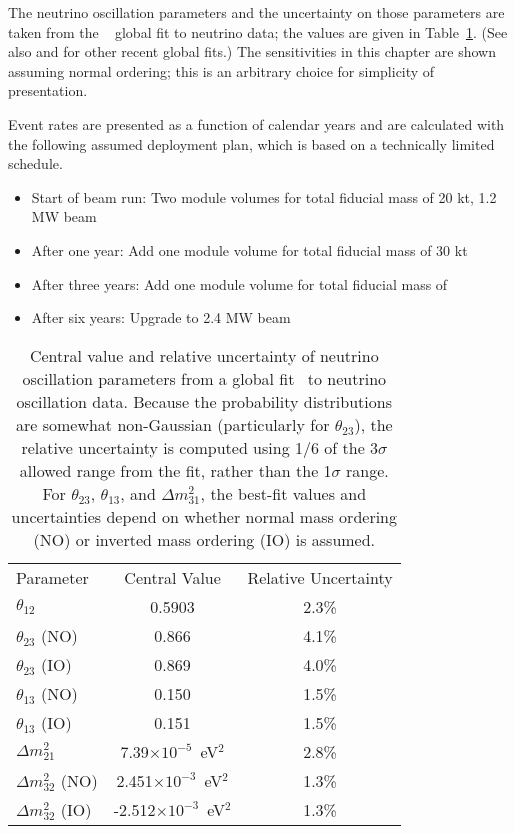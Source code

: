 The neutrino oscillation parameters and the uncertainty on those parameters are taken from the ~\cite{Esteban:2018azc,nufitweb} global fit to neutrino data; the
values are given in Table~\ref{tab:oscpar_nufit}.  (See also
\cite{deSalas:2017kay} and \cite{Capozzi:2017yic} for other recent global fits.) The sensitivities in this chapter are shown assuming normal ordering; this is an arbitrary choice for simplicity of presentation.

Event rates are presented as a function of calendar years and are calculated with the following assumed deployment plan, which is based on a technically limited schedule.
\begin{itemize}
    \item Start of beam run: Two  module %
    volumes for total fiducial mass of 20 kt, 1.2 MW beam
    \item After one year: Add one  module  volume for total fiducial mass of 30 kt
    \item After three years: Add one  module  volume for total fiducial mass of \fdfiducialmass
    \item After six years: Upgrade to 2.4 MW beam
\end{itemize}

\begin{table}[]
    \centering
    \begin{tabular}{lcc}
 Parameter &    Central Value & Relative Uncertainty \\
\toprowrule
$\theta_{12}$ & 0.5903 & 2.3\% \\ \colhline
$\theta_{23}$ (NO) & 0.866  & 4.1\% \\ 
$\theta_{23}$ (IO) & 0.869  & 4.0\% \\ \colhline
$\theta_{13}$ (NO) & 0.150  & 1.5\% \\ 
$\theta_{13}$ (IO) & 0.151  & 1.5\% \\ \colhline
$\Delta m^2_{21}$ & 7.39$\times10^{-5}$~eV$^2$ & 2.8\% \\ \colhline
$\Delta m^2_{32}$ (NO) & 2.451$\times10^{-3}$~eV$^2$ &  1.3\% \\
$\Delta m^2_{32}$ (IO) & -2.512$\times10^{-3}$~eV$^2$ &  1.3\% \\
    \end{tabular}
    \caption[Parameter values and uncertainties from a global fit to neutrino oscillation data]{Central value and relative uncertainty of neutrino oscillation parameters from a global fit~\cite{Esteban:2018azc,nufitweb} to neutrino oscillation data. Because the probability distributions are somewhat non-Gaussian (particularly for $\theta_{23}$), the relative uncertainty is computed using 1/6 of the 3$\sigma$ allowed range from the fit, rather than the 1$\sigma$ range.   For $\theta_{23}$, $\theta_{13}$, and $\Delta m^2_{31}$, the best-fit values and uncertainties depend on whether normal mass ordering (NO) or inverted mass ordering (IO) is assumed.}
    \label{tab:oscpar_nufit}
\end{table}

